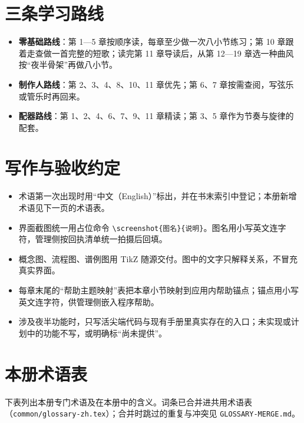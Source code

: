 \section*{三条学习路线}

\begin{itemize}
\item \textbf{零基础路线}：第 1—5 章按顺序读，每章至少做一次八小节练习；第 10 章跟着走查做一首完整的短歌；读完第 11 章导读后，从第 12—19 章选一种曲风按“夜半骨架”再做八小节。
\item \textbf{制作人路线}：第 2、3、4、8、10、11 章优先；第 6、7 章按需查阅，写弦乐或管乐时再回来。
\item \textbf{配器路线}：第 1、2、4、6、7、9、11 章精读；第 3、5 章作为节奏与旋律的配套。
\end{itemize}

\section*{写作与验收约定}

\begin{itemize}
\item 术语第一次出现时用“中文（English）”标出，并在书末索引中登记；本册新增术语见下一页的术语表。
\item 界面截图统一用占位命令 \verb|\screenshot{图名}{说明}|。图名用小写英文连字符，管理侧按回执清单统一拍摄后回填。
\item 概念图、流程图、谱例图用 TikZ 随源交付。图中的文字只解释关系，不冒充真实界面。
\item 每章末尾的“帮助主题映射”表把本章小节映射到应用内帮助锚点；锚点用小写英文连字符，供管理侧嵌入程序帮助。
\item 涉及夜半功能时，只写活尖端代码与现有手册里真实存在的入口；未实现或计划中的功能不写，或明确标“尚未提供”。
\end{itemize}

\section*{本册术语表}

下表列出本册专门术语及在本册中的含义。词条已合并进共用术语表（\texttt{common/\allowbreak glossary-zh.tex}）；合并时跳过的重复与冲突见 \texttt{GLOSSARY-MERGE.md}。

